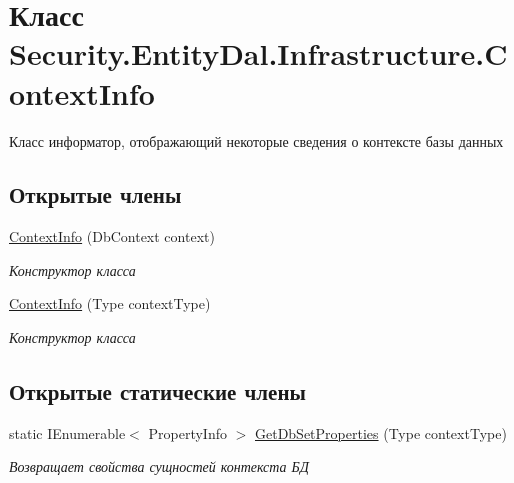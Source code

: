 \hypertarget{class_security_1_1_entity_dal_1_1_infrastructure_1_1_context_info}{}\section{Класс Security.\+Entity\+Dal.\+Infrastructure.\+Context\+Info}
\label{class_security_1_1_entity_dal_1_1_infrastructure_1_1_context_info}


Класс информатор, отображающий некоторые сведения о контексте базы данных  


\subsection*{Открытые члены}
\begin{DoxyCompactItemize}
\item 
\hyperlink{class_security_1_1_entity_dal_1_1_infrastructure_1_1_context_info_a4c662fa70c4b9f7796cf8265818bc5b4}{Context\+Info} (Db\+Context context)
\begin{DoxyCompactList}\small\item\em Конструктор класса \end{DoxyCompactList}\item 
\hyperlink{class_security_1_1_entity_dal_1_1_infrastructure_1_1_context_info_a7b4f4859eefa00ca23187ac9652d1628}{Context\+Info} (Type context\+Type)
\begin{DoxyCompactList}\small\item\em Конструктор класса \end{DoxyCompactList}\end{DoxyCompactItemize}
\subsection*{Открытые статические члены}
\begin{DoxyCompactItemize}
\item 
static I\+Enumerable$<$ Property\+Info $>$ \hyperlink{class_security_1_1_entity_dal_1_1_infrastructure_1_1_context_info_a017bfdbd4b2aaf4fa6d2739a46e03f68}{Get\+Db\+Set\+Properties} (Type context\+Type)
\begin{DoxyCompactList}\small\item\em Возвращает свойства сущностей контекста БД \end{DoxyCompactList}\end{DoxyCompactItemize}
